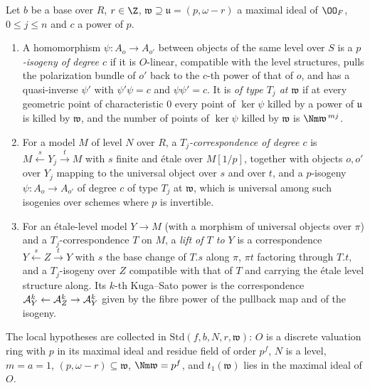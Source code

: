 \begin{definition}\label{pf:ks2:def:tj}
Let $b$ be a base over $R$, $r\in\Z$, $\mathfrak w\supseteq\mathfrak u=(p,\omega-r)$ a maximal ideal of
$\kstwoOF$, $0\le j\le n$ and $c$ a power of $p$.
\begin{enumerate}
\item A homomorphism $\psi\colon A_o\to A_{o'}$ between objects of the same level over $S$ is a
  \emph{$p$-isogeny of degree $c$} if it is $O$-linear,
  compatible with the level structures, pulls the polarization bundle of $o'$ back to the $c$-th
  power of that of $o$, and has a quasi-inverse $\psi'$ with $\psi'\psi=c$ and $\psi\psi'=c$. It is
  \emph{of type $T_j$ at $\mathfrak w$} if at every geometric
  point of characteristic $0$ every point of $\ker\psi$ killed by a power of $\mathfrak u$ is killed
  by $\mathfrak w$, and the number of points of $\ker\psi$ killed by $\mathfrak w$ is
  $\Nm\mathfrak w^{\,mj}$.
\item For a model $M$ of level $N$ over $R$, a \emph{$T_j$-correspondence of degree $c$} is $M\xleftarrow{s}Y_j\xrightarrow{t}M$
  with $s$ finite and \'etale over $M[1/p]$, together with objects $o,o'$ over $Y_j$ mapping to the
  universal object over $s$ and over $t$, and a $p$-isogeny $\psi\colon A_o\to A_{o'}$ of degree $c$
  of type $T_j$ at $\mathfrak w$, which is universal among such isogenies over schemes where $p$ is
  invertible.
\item For an \'etale-level model $Y\to M$ (with a morphism of universal objects over $\pi$) and a
  $T_j$-correspondence $T$ on $M$, a \emph{lift of $T$ to $Y$} is a correspondence
  $Y\xleftarrow{s}Z\xrightarrow{t}Y$ with $s$ the base change of $T.s$ along $\pi$, $\pi t$
  factoring through $T.t$, and a $T_j$-isogeny over $Z$ compatible with that of $T$ and carrying
  the \'etale level structure along. Its $k$-th Kuga--Sato power is the correspondence
  $\mathcal{A}_Y^k\leftarrow\mathcal{A}_Z^k\to\mathcal{A}_Y^k$ given by the fibre power of the pullback map and
  of the isogeny.
\end{enumerate}
\end{definition}

The local hypotheses are collected in $\mathrm{Std}(f,b,N,r,\mathfrak w)$: $O$ is a discrete valuation ring with
$p$ in its maximal ideal and residue field of order $p^f$, $N$ is a level, $m=a=1$,
$(p,\omega-r)\subseteq\mathfrak w$, $\Nm\mathfrak w=p^f$, and $t_1(\mathfrak w)$ lies in the maximal
ideal of $O$.

